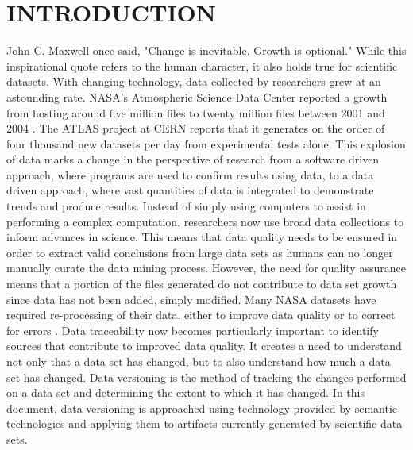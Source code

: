 
\chapter{INTRODUCTION}

John C. Maxwell once said, "Change is inevitable.  Growth is optional."
While this inspirational quote refers to the human character, it also holds true for scientific datasets.
With changing technology, data collected by researchers grew at an astounding rate.
NASA's Atmospheric Science Data Center reported a growth from hosting around five million files to twenty million files between 2001 and 2004 \cite{Barkstrom_digitallibrary}.
The ATLAS project at CERN reports that it generates on the order of four thousand new datasets per day from experimental tests alone\cite{Branco2008}.
This explosion of data marks a change in the perspective of research from a software driven approach, where programs are used to confirm results using data, to a data driven approach, where vast quantities of data is integrated to demonstrate trends and produce results.
Instead of simply using computers to assist in performing a complex computation, researchers now use broad data collections to inform advances in science.
This means that data quality needs to be ensured in order to extract valid conclusions from large data sets as humans can no longer manually curate the data mining process.
However, the need for quality assurance means that a portion of the files generated do not contribute to data set growth since data has not been added, simply modified.
Many NASA datasets have required re-processing of their data, either to improve data quality or to correct for errors \cite{barkstrom2014earth}.
Data traceability now becomes particularly important to identify sources that contribute to improved data quality.
It creates a need to understand not only that a data set has changed, but to also understand how much a data set has changed.
Data versioning is the method of tracking the changes performed on a data set and determining the extent to which it has changed.
In this document, data versioning is approached using technology provided by semantic technologies and applying them to artifacts currently generated by scientific data sets.

